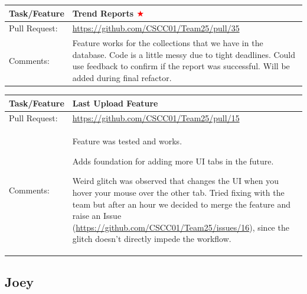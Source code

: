 \documentclass[12pt]{article}
\begin{document}
\begin{table}[H]
\begin{tabular}{|p{3cm}|p{11cm}|}
\hline
Task/Feature  & Trend Reports \textcolor{red}{$\bigstar$}
 \\ \hline
Pull Request: & \url{https://github.com/CSCC01/Team25/pull/35}                                                                                                                                                                                                                                                                                                                      \\ \hline
Comments:     & Feature works for the collections that we have in the database. Code is a little messy due to tight deadlines. Could use feedback to confirm if the report was successful. Will be added during final refactor.
 \\ \hline
\end{tabular}
\end{table}

\begin{table}[H]
\begin{tabular}{|p{3cm}|p{11cm}|}
\hline
Task/Feature  & Last Upload Feature
 \\ \hline
Pull Request: & \url{https://github.com/CSCC01/Team25/pull/15}                                                                                                                                                                                                                                                                                                                      \\ \hline
Comments:     & Feature was tested and works.

Adds foundation for adding more UI tabs in the future.

Weird glitch was observed that changes the UI when you hover your mouse over the other tab. Tried fixing with the team but after an hour we decided to merge the feature and raise an Issue (\url{https://github.com/CSCC01/Team25/issues/16}), since the glitch doesn’t directly impede the workflow.
 \\ \hline
\end{tabular}
\end{table}

\subsection{Joey}
\end{document}
